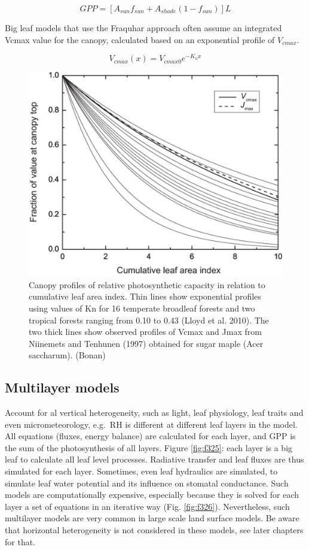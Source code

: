 \documentclass[
  12pt,
  oneside]{book}
\begin{document}
\[
GPP = \left[A_{sun} f_{sun} + A_{shade} (1 - f_{sun}) \right]L
\]

Big leaf models that use the Fraquhar approach often assume an integrated Vcmax value for the canopy, calculated based on an exponential profile of \(V_{cmax}\).

\[
V_{cmax}(x) = V_{cmax0} e^{-K_n x}
\]

\begin{figure}

{\centering \includegraphics[width=0.8\linewidth]{figures/chap3/f324_vcamx_profile} 

}

\caption{Canopy profiles of relative photosynthetic capacity in relation to cumulative leaf area index. Thin lines show exponential profiles using values of Kn for 16 temperate broadleaf forests and two tropical forests ranging from 0.10 to 0.43 (Lloyd et al. 2010). The two thick lines show observed profiles of Vcmax and Jmax from Niinemets and Tenhunen (1997) obtained for sugar maple (Acer saccharum). (Bonan)}\label{fig:f324}
\end{figure}

\hypertarget{multilayer-models}{%
\subsection{Multilayer models}\label{multilayer-models}}

Account for al vertical heterogeneity, such as light, leaf physiology, leaf traits and even micrometeorology, e.g.~RH is different at different leaf layers in the model. All equations (fluxes, energy balance) are calculated for each layer, and GPP is the sum of the photosynthesis of all layers. Figure \ref{fig:f325}: each layer is a big leaf to calculate all leaf level processes. Radiative transfer and leaf fluxes are thus simulated for each layer. Sometimes, even leaf hydraulics are simulated, to simulate leaf water potential and its influence on stomatal conductance. Such models are computationally expensive, especially because they is solved for each layer a set of equations in an iterative way (Fig. \ref{fig:f326}). Nevertheless, such multilayer models are very common in large scale land surface models. Be aware that horizontal heterogeneity is not considered in these models, see later chapters for that.
\end{document}
